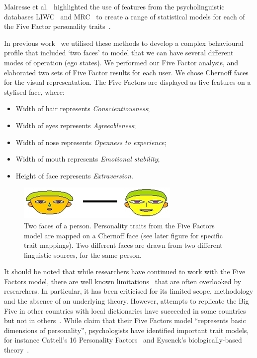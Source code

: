 \documentclass{AISB2008}
\begin{document}
Mairesse et al.~\cite{mairesse-et-al:2007} highlighted the use of
features from the psycholinguistic databases
LIWC~\cite{pennebaker-et-al:2001} and MRC~\cite{wilson:1988} to create
a range of statistical models for each of the Five Factor personality
traits~\cite{norman:1963,peabody+goldberg:1989}.

In previous work~\cite{oatley+crick:2014} we utilised these methods to
develop a complex behavioural profile that included `two faces' to
model that we can have several different modes of operation (ego
states). We performed our Five Factor analysis, and elaborated two
sets of Five Factor results for each user. We chose Chernoff
faces~\cite{chernoff:1973} for the visual representation. The Five
Factors are displayed as five features on a stylised face, where:

\begin{itemize}
\item Width of hair represents {\emph{Conscientiousness}}; 
\item Width of eyes represents {\emph{Agreeableness}};
\item Width of nose represents {\emph{Openness to experience}}; 
\item Width of mouth represents {\emph{Emotional stability}};
\item Height of face represents {\emph{Extraversion}}.
\end{itemize}

\begin{figure}[!htb]
\centering
\includegraphics[width=\columnwidth]{images/newtwofaces.jpg}
\caption{Two faces of a person. Personality traits from the Five
  Factors model are mapped on a Chernoff face (see later figure for
  specific trait mappings). Two different faces are drawn from two
  different linguistic sources, for the same person.}
\label{fig:twofaces}
\end{figure}

It should be noted that while researchers have continued to work with
the Five Factors model, there are well known
limitations~\cite{eysenck:1992,paunonen+jackson:2000,block:2010} that
are often overlooked by researchers. In particular, it has been
criticised for its limited scope, methodology and the absence of an
underlying theory. However, attempts to replicate the Big Five in other
countries with local dictionaries have succeeded in some countries but
not in others~\cite{szirmak+deraad:1994,defruyt-et-al:2004}. While
\cite{costa+mccrae:1992} claim that their Five Factors model
``represents basic dimensions of personality'', psychologists have
identified important trait models, for instance Cattell's 16
Personality Factors~\cite{cattell:1946} and Eysenck's
biologically-based theory~\cite{eysenck:1947}.
\end{document}
